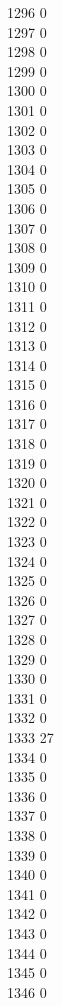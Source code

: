 { 1296	0 \\
 1297	0 \\
 1298	0 \\
 1299	0 \\
 1300	0 \\
 1301	0 \\
 1302	0 \\
 1303	0 \\
 1304	0 \\
 1305	0 \\
 1306	0 \\
 1307	0 \\
 1308	0 \\
 1309	0 \\
 1310	0 \\
 1311	0 \\
 1312	0 \\
 1313	0 \\
 1314	0 \\
 1315	0 \\
 1316	0 \\
 1317	0 \\
 1318	0 \\
 1319	0 \\
 1320	0 \\
 1321	0 \\
 1322	0 \\
 1323	0 \\
 1324	0 \\
 1325	0 \\
 1326	0 \\
 1327	0 \\
 1328	0 \\
 1329	0 \\
 1330	0 \\
 1331	0 \\
 1332	0 \\
 1333	27 \\
 1334	0 \\
 1335	0 \\
 1336	0 \\
 1337	0 \\
 1338	0 \\
 1339	0 \\
 1340	0 \\
 1341	0 \\
 1342	0 \\
 1343	0 \\
 1344	0 \\
 1345	0 \\
 1346	0 \\
}
